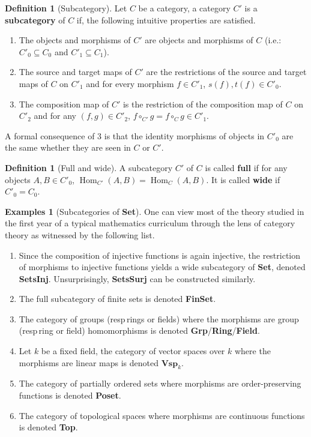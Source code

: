 \documentclass{article}
\theoremstyle{definition}
\newtheorem{defn}[thm]{Definition}
\newtheorem{exmps}[thm]{Examples}
\theoremstyle{remark}
\DeclareMathOperator{\Hom}{Hom}
\begin{document}
\begin{defn}[Subcategory]
	Let $C$ be a category, a category $C'$ is a \textbf{subcategory} of $C$ if, the following intuitive properties are satisfied.
	\begin{enumerate}
		\item The objects and morphisms of $C'$ are objects and morphisms of $C$ (i.e.: $C'_0 \subseteq C_0$ and $C'_1 \subseteq C_1$).
		\item The source and target maps of $C'$ are the restrictions of the source and target maps of $C$ on $C'_1$ and for every morphism $f \in C'_1$, $s(f), t(f) \in C'_0$.
		\item The composition map of $C'$ is the restriction of the composition map of $C$ on $C'_2$ and for any $(f,g) \in C'_2$, $f\circ_{C'} g = f \circ_{C} g \in C'_1$. 
	\end{enumerate}
	A formal consequence of 3 is that the identity morphisms of objects in $C'_0$ are the same whether they are seen in $C$ or $C'$.
\end{defn}
\begin{defn}[Full and wide]
	A subcategory $C'$ of $C$ is called \textbf{full} if for any objects $A,B \in C'_0$, $\Hom_{C'}(A,B) = \Hom_{C}(A,B)$. It is called \textbf{wide} if $C'_0 = C_0$.
\end{defn}
\begin{exmps}[Subcategories of \textbf{Set}]
	One can view most of the theory studied in the first year of a typical mathematics curriculum through the lens of category theory as witnessed by the following list.
	\begin{enumerate}
		\item Since the composition of injective functions is again injective, the restriction of morphisms to injective functions yields a wide subcategory of \textbf{Set}, denoted \textbf{SetsInj}. Unsurprisingly, \textbf{SetsSurj} can be constructed similarly.
		\item The full subcategory of finite sets is denoted \textbf{FinSet}.
		\item The category of groups (resp\,rings or fields) where the morphisms are group (resp\,ring or field) homomorphisms is denoted \textbf{Grp}/\textbf{Ring}/\textbf{Field}.
		\item Let $k$ be a fixed field, the category of vector spaces over $k$ where the morphisms are linear maps is denoted $\textbf{Vsp}_k$.
		\item The category of partially ordered sets where morphisms are order-preserving functions is denoted \textbf{Poset}.
		\item The category of topological spaces where morphisms are continuous functions is denoted \textbf{Top}.
	\end{enumerate}
\end{exmps}
\end{document}
